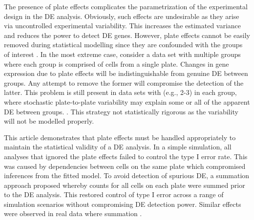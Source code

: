 \documentclass[oupdraft]{bio}
\begin{document}
The presence of plate effects complicates the parametrization of the experimental design in the DE analysis.
Obviously, such effects are undesirable as they arise via uncontrolled experimental variability.
This increases the estimated variance and reduces the power to detect DE genes.
However, plate effects cannot be easily removed during statistical modelling since they are confounded with the groups of interest \citep{hicks2015widespread}.
In the most extreme case, consider a data set with multiple groups where each group is comprised of cells from a single plate.
Changes in gene expression due to plate effects will be indistinguishable from genuine DE between groups.
Any attempt to remove the former will compromise the detection of the latter.
This problem is still present in data sets with  (e.g., 2-3) in each group, 
    where stochastic plate-to-plate variability may explain some or all of the apparent DE between groups.
.
This strategy  not statistically rigorous as the variability  will not be modelled properly.


This article demonstrates that plate effects must be handled appropriately to maintain the statistical validity of a DE analysis.
In a simple simulation, all analyses that ignored the plate effects failed to control the type I error rate.
This was caused by dependencies between cells on the same plate which compromised inferences from the fitted model.
To avoid detection of spurious DE, a summation approach  proposed whereby counts for all cells on each plate were summed prior to the DE analysis.
This restored control of type I error across a range of simulation scenarios without compromising DE detection power.
Similar effects were observed in real data where summation .
\end{document}
